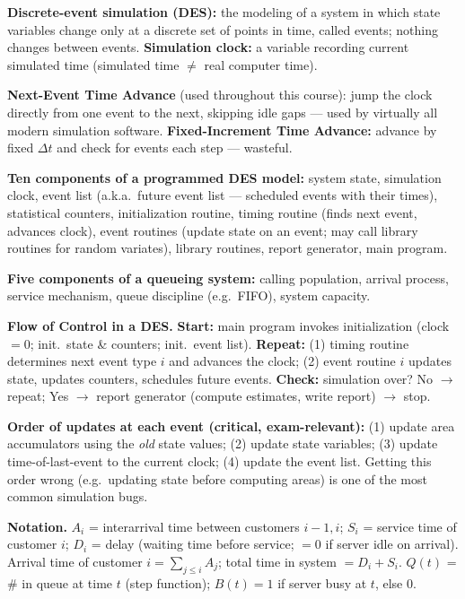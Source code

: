 \begin{defbox}
\textbf{Discrete-event simulation (DES):} the modeling of a system in which state variables change only at a discrete set of points in time, called events; nothing changes between events. \textbf{Simulation clock:} a variable recording current simulated time (simulated time $\neq$ real computer time).
\end{defbox}

\textbf{Next-Event Time Advance} (used throughout this course): jump the clock directly from one event to the next, skipping idle gaps — used by virtually all modern simulation software. \textbf{Fixed-Increment Time Advance:} advance by fixed $\Delta t$ and check for events each step — wasteful.

\textbf{Ten components of a programmed DES model:} system state, simulation clock, event list (a.k.a.\ future event list — scheduled events with their times), statistical counters, initialization routine, timing routine (finds next event, advances clock), event routines (update state on an event; may call library routines for random variates), library routines, report generator, main program.

\textbf{Five components of a queueing system:} calling population, arrival process, service mechanism, queue discipline (e.g.\ FIFO), system capacity.

\begin{examplebox}
\textbf{Flow of Control in a DES.} \textbf{Start:} main program invokes initialization (clock$=0$; init.\ state \& counters; init.\ event list). \textbf{Repeat:} (1) timing routine determines next event type $i$ and advances the clock; (2) event routine $i$ updates state, updates counters, schedules future events. \textbf{Check:} simulation over? No $\to$ repeat; Yes $\to$ report generator (compute estimates, write report) $\to$ stop.

\textbf{Order of updates at each event (critical, exam-relevant):} (1) update area accumulators using the \emph{old} state values; (2) update state variables; (3) update time-of-last-event to the current clock; (4) update the event list. Getting this order wrong (e.g.\ updating state before computing areas) is one of the most common simulation bugs.
\end{examplebox}

\textbf{Notation.} $A_i$ = interarrival time between customers $i{-}1,i$; $S_i$ = service time of customer $i$; $D_i$ = delay (waiting time before service; $=0$ if server idle on arrival). Arrival time of customer $i=\sum_{j\le i}A_j$; total time in system $=D_i+S_i$. $Q(t)$ = \# in queue at time $t$ (step function); $B(t)=1$ if server busy at $t$, else $0$.

